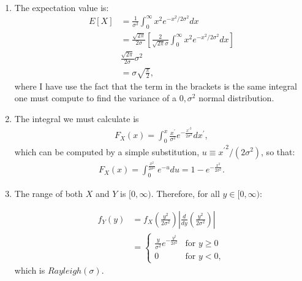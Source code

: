 \begin{problem}{20}$ $
\begin{enumerate}
\item The expectation value is:
	\begin{align*}
	E[X] &= \frac{1}{\sigma^2}\int_0^\infty x^2e^{-x^2/2\sigma^2}dx \\
	& = \frac{\sqrt{2 \pi}}{2 \sigma}\left[\frac{2}{\sqrt{2 \pi} \sigma}\int_0^\infty x^2e^{-x^2/2\sigma^2}dx\right] \\
	& \frac{\sqrt{2 \pi}}{2 \sigma}\sigma^2 \\
	& = \sigma \sqrt{\frac{\pi}{2}},
	\end{align*}
where I have use the fact that the term in the brackets is the same integral one must compute to find the variance of a $0, \sigma^2$ normal distribution.

\item The integral we must calculate is
	\begin{align*}
	F_X(x) = \int_0^{x} \frac{x^\prime}{\sigma^2} e^{-\frac{{x^\prime}^2}{2 \sigma^2}}dx^\prime,
	\end{align*}
	which can be computed by a simple substitution, $u \equiv {x^\prime}^2/(2\sigma^2)$, so that:
	\begin{align*}
	F_X(x) = \int_0^{\frac{x^2}{2\sigma^2}} e^{-u} du = 1 - e^{-\frac{x^2}{2 \sigma^2}}.
	\end{align*}

\item The range of both $X$ and $Y$ is $[0, \infty)$.  Therefore, for all $y \in [0, \infty)$:


\begin{align*}  
  f_Y(y) &= f_X \left(\frac{y^2}{2 \sigma^2}\right) \left|\frac{d}{dy}\left(\frac{y^2}{2\sigma^2}\right) \right| \\
&= \begin{cases}
                                   \frac{y}{\sigma^2} e^{-\frac{y^2}{2\sigma^2}} & \text{for $y \ge 0$} \\
                                   0 & \text{for  $y<0$},
       \end{cases}
\end{align*}
which is $Rayleigh(\sigma)$.
\end{enumerate}
\end{problem}

